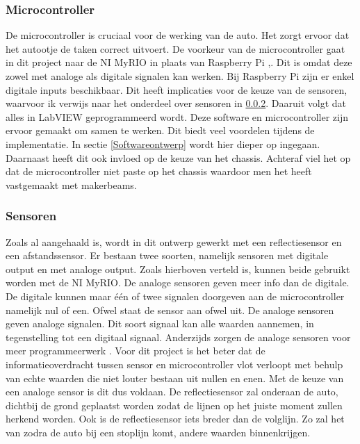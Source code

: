 \documentclass[a4paper,twoside,kulak]{kulakreport} %
\begin{document}
\subsubsection{Microcontroller}
De microcontroller is cruciaal voor de werking van de auto. Het zorgt ervoor dat het autootje de taken correct uitvoert. De voorkeur van de microcontroller gaat in dit project naar de NI MyRIO in plaats van Raspberry Pi \cite{nimyrio},\cite{RaspberryPi}.
Dit is omdat deze zowel met analoge als digitale signalen kan werken. 
Bij Raspberry Pi zijn er enkel digitale inputs beschikbaar. Dit heeft implicaties voor de keuze van de sensoren, waarvoor ik verwijs naar het onderdeel over sensoren in \ref{Sensoren}.
Daaruit volgt dat alles in LabVIEW geprogrammeerd wordt.
Deze software en microcontroller zijn ervoor gemaakt om samen te werken. Dit biedt veel voordelen tijdens de implementatie. In sectie \ref{Softwareontwerp} wordt hier dieper op ingegaan. %
Daarnaast heeft dit ook invloed op de keuze van het chassis. Achteraf viel het op dat de microcontroller niet paste op het chassis waardoor men het heeft vastgemaakt met makerbeams.

\label{Microcontroller}

\subsubsection{Sensoren} \label{Sensoren}
Zoals al aangehaald is, wordt in dit ontwerp gewerkt met een reflectiesensor en een afstandssensor. Er bestaan twee soorten, namelijk sensoren met digitale output en met analoge output. Zoals hierboven verteld is, kunnen beide gebruikt worden met de NI MyRIO. De analoge sensoren geven meer info dan de digitale. De digitale kunnen maar één of twee signalen doorgeven aan de microcontroller namelijk nul of een. Ofwel staat de sensor aan ofwel uit. De analoge sensoren geven analoge signalen. Dit soort signaal kan alle waarden aannemen, in tegenstelling tot een digitaal signaal. Anderzijds zorgen de analoge sensoren voor meer programmeerwerk \cite{DigitaalOfAnaloog}. Voor dit project is het beter dat de informatieoverdracht tussen sensor en microcontroller vlot verloopt met behulp van echte waarden die niet louter bestaan uit nullen en enen. Met de keuze van een analoge sensor is dit dus voldaan. %
De reflectiesensor zal onderaan de auto, dichtbij de grond geplaatst worden zodat de lijnen op het juiste moment zullen herkend worden. Ook is de reflectiesensor iets breder dan de volglijn. Zo zal het van zodra de auto bij een stoplijn komt, andere waarden binnenkrijgen.
\end{document}
